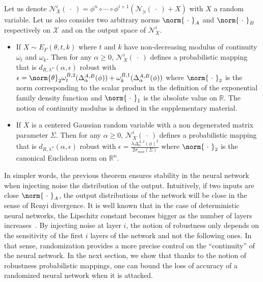 \begin{theorem}
\label{theorem:ap3-netrob}
Let us denote $\mathcal{N}_{X}^i(\ \cdot\ ) = \phi^n\circ \cdots \circ\phi^{i+1}(\mathcal{N}_{|i}(\ \cdot\ )+X)$ with $X$ a random variable.
Let us also consider two arbitrary norms $\norm{\ \cdot\ }_{A}$ and $\norm{\ \cdot\ }_{B}$  respectively on $\mathcal{X}$ and on the output space of $\mathcal{N}_{X}^i$.

\begin{itemize}
  \item If $X\sim E_{F}(\theta,t,k)$ where $t$ and $k$ have non-decreasing modulus of continuity $\omega_t$ and $\omega_k$.
  Then for any $\alpha \geq 0$, $\mathcal{N}_{X}^i(\ \cdot\ )$ defines a probabilistic mapping that is $d_{R,\lambda}$-$(\alpha,\epsilon)$ robust with $\epsilon = \norm{\theta}_2 \omega^{B,2}_t(\Delta^{A,B}_{\alpha}(\phi)) +\omega_k^{B,1}(\Delta^{A,B}_{\alpha}(\phi)) $ where $\norm{\ \cdot\ }_2$ is the norm corresponding to the scalar product in the definition of the exponential family density function and $\norm{\ \cdot\ }_1$ is the absolute value on $\mathbb{R}$.
  The notion of continuity modulus is defined in the supplementary material.
    
  \item If $X$ is a centered Gaussian random variable with a non degenerated matrix parameter $\Sigma$.
    Then for any $\alpha \geq 0$, $\mathcal{N}_{X}^i(\ \cdot\ )$ defines a probabilistic mapping that is $d_{R,\lambda}$-$(\alpha,\epsilon)$ robust with $ \epsilon = \frac{\lambda \Delta^{A,2}_{\alpha}(\phi)^2 }{2 \sigma_{min}(\Sigma) } $ where $\norm{\ \cdot\ }_2$ is the canonical Euclidean norm on $\mathbb{R}^n$.
\end{itemize}
\end{theorem}

In simpler words, the previous theorem ensures stability in the neural network when injecting noise \wrt the distribution of the output.
Intuitively, if two inputs are close \wrt $\norm{\ \cdot\ }_{A}$, the output distributions of the network will be close in the sense of Renyi divergence.
It is well known that in the case of deterministic neural networks, the Lipschitz constant becomes bigger as the number of layers increases~\cite{gouk2018regularisation}.
By injecting noise at layer $i$, the notion of robustness only depends on the sensitivity of the first $i$ layers of the network and not the following ones.
In that sense, randomization provides a more precise control on the ``continuity'' of the neural network.
In the next section, we show that thanks to the notion of robustness \wrt probabilistic mappings, one can bound the loss of accuracy of a randomized neural network when it is attacked. 

